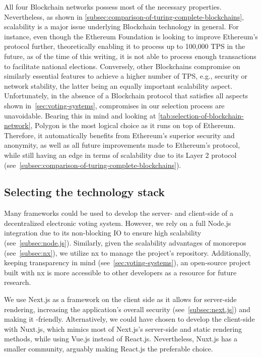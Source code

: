 All four \gls{Blockchain} networks possess most of the necessary properties.
Nevertheless, as shown in \cref{subsec:comparison-of-turing-complete-blockchains}, scalability is a major issue underlying \gls{Blockchain} technology in general.
For instance, even though the Ethereum Foundation is looking to improve Ethereum's protocol further, theoretically enabling it to process up to 100,000 \gls{TPS} in the future, as of the time of this writing, it is not able to process enough transactions to facilitate national elections.
Conversely, other \glspl{Blockchain} compromise on similarly essential features to achieve a higher number of \gls{TPS}, e.g., security or network stability, the latter being an equally important scalability aspect.
Unfortunately, in the absence of a \gls{Blockchain} protocol that satisfies all aspects shown in~\cref{sec:voting-systems}, compromises in our selection process are unavoidable.
Bearing this in mind and looking at \cref{tab:selection-of-blockchain-network}, Polygon is the most logical choice as it runs on top of Ethereum.
Therefore, it automatically benefits from Ethereum's superior security and anonymity, as well as all future improvements made to Ethereum's protocol, while still having an edge in terms of scalability due to its Layer 2 protocol (see~\cref{subsec:comparison-of-turing-complete-blockchains}).

\subsection{Selecting the technology stack}\label{subsec:selection-of-tech-stack}

Many frameworks could be used to develop the server- and client-side of a decentralized electronic voting system.
However, we rely on a full Node.js integration due to its non-blocking \gls{IO} to ensure high scalability (see~\cref{subsec:node.js}).
Similarly, given the scalability advantages of monorepos (see~\cref{subsec:nx}), we utilize nx to manage the project's repository.
Additionally, keeping transparency in mind (see~\cref{sec:voting-systems}), an open-source project built with nx is more accessible to other developers as a resource for future research.

We use Next.js as a framework on the client side as it allows for server-side rendering, increasing the application's overall security (see~\cref{subsec:next.js}) and making it -friendly.
Alternatively, we could have chosen to develop the client-side with Nuxt.js, which mimics most of Next.js's server-side and static rendering methods, while using Vue.js instead of React.js.
Nevertheless, Nuxt.js has a smaller community, arguably making React.js the preferable choice.


